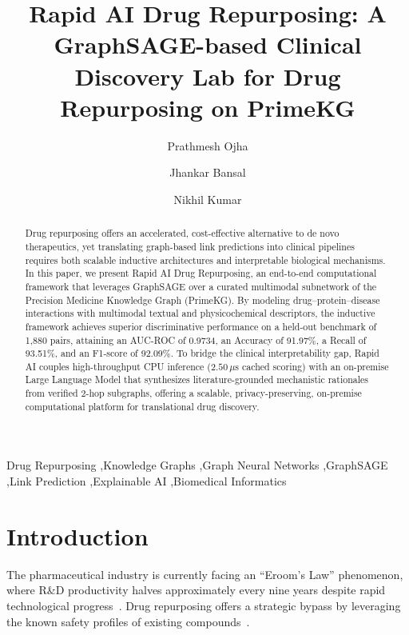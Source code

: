\documentclass[preprint,12pt]{elsarticle}
\def\corref#1{}%
\begin{document}
\begin{frontmatter}

\title{Rapid AI Drug Repurposing: A GraphSAGE-based Clinical Discovery Lab for Drug Repurposing on PrimeKG}

\author[inst1]{Prathmesh Ojha}
\author[inst1]{Jhankar Bansal}
\author[inst1]{Nikhil Kumar\corref{cor1}}

\address[inst1]{School of Engineering and Technology, BML Munjal University, Gurugram, Haryana, India}

\begin{abstract}
Drug repurposing offers an accelerated, cost-effective alternative to de novo therapeutics, yet translating graph-based link predictions into clinical pipelines requires both scalable inductive architectures and interpretable biological mechanisms. In this paper, we present Rapid AI Drug Repurposing, an end-to-end computational framework that leverages GraphSAGE over a curated multimodal subnetwork of the Precision Medicine Knowledge Graph (PrimeKG). By modeling drug--protein--disease interactions with multimodal textual and physicochemical descriptors, the inductive framework achieves superior discriminative performance on a held-out benchmark of 1,880 pairs, attaining an AUC-ROC of 0.9734, an Accuracy of 91.97\%, a Recall of 93.51\%, and an F1-score of 92.09\%. To bridge the clinical interpretability gap, Rapid AI couples high-throughput CPU inference ($2.50\,\mu\mathrm{s}$ cached scoring) with an on-premise Large Language Model that synthesizes literature-grounded mechanistic rationales from verified 2-hop subgraphs, offering a scalable, privacy-preserving, on-premise computational platform for translational drug discovery.
\end{abstract}

\begin{keyword}
Drug Repurposing \sep Knowledge Graphs \sep Graph Neural Networks \sep GraphSAGE \sep Link Prediction \sep Explainable AI \sep Biomedical Informatics
\end{keyword}

\end{frontmatter}

\section{Introduction}

The pharmaceutical industry is currently facing an ``Eroom's Law'' phenomenon, where R\&D productivity halves approximately every nine years despite rapid technological progress~\cite{ref_eroom}. Drug repurposing offers a strategic bypass by leveraging the known safety profiles of existing compounds~\cite{ref6,ref7}.
\end{document}
